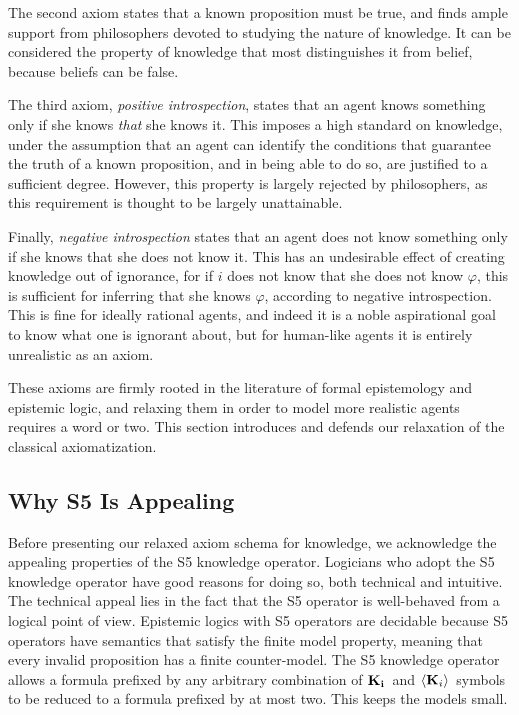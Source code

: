 The second axiom states that a known proposition must be true, and finds ample support from philosophers devoted to studying the nature of knowledge. It can be considered the property of knowledge that most distinguishes it from belief, because beliefs can be false.

The third axiom, \emph{positive introspection}, states that an agent knows something only if she knows \emph{that} she knows it. This imposes a high standard on knowledge, under the assumption that an agent can identify the conditions that guarantee the truth of a known proposition, and in being able to do so, are justified to a sufficient degree. However, this property is largely rejected by philosophers, as this requirement is thought to be largely unattainable. 

Finally, \emph{negative introspection} states that an agent does not know something only if she knows that she does not know it. This has an undesirable effect of creating knowledge out of ignorance, for if $i$ does not know that she does not know $\varphi$, this is sufficient for inferring that she knows $\varphi$, according to negative introspection. This is fine for ideally rational agents, and indeed it is a noble aspirational goal to know what one is ignorant about, but for human-like agents it is entirely unrealistic as an axiom.

These axioms are firmly rooted in the literature of formal epistemology and epistemic logic, and relaxing them in order to model more realistic agents requires a word or two. This section introduces and defends our relaxation of the classical axiomatization.

\subsection{Why S5 Is Appealing} 
Before presenting our relaxed axiom schema for knowledge, we acknowledge the appealing properties of the S5 knowledge operator. Logicians who adopt the S5 knowledge operator have good reasons for doing so, both technical and intuitive. The technical appeal lies in the fact that the S5 operator is well-behaved from a logical point of view. Epistemic logics with S5 operators are decidable because S5 operators have semantics that satisfy the finite model property, meaning that every invalid proposition has a finite counter-model. The S5 knowledge operator allows a formula prefixed by any arbitrary combination of $\mathbf{K}_{\mathbf{i}}\,$ and $\langle \mathbf{K}_{i} \rangle\,$ symbols to be reduced to a formula prefixed by at most two. This keeps the models small.


